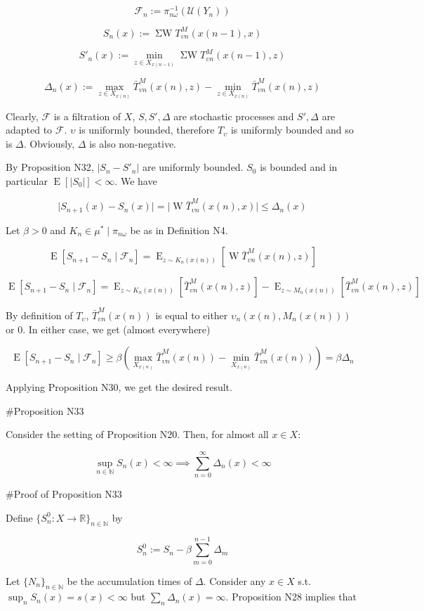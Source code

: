 \documentclass[a4paper]{article}
\DeclareMathOperator{\E}{E}
\newcommand{\Nats}{\mathbb{N}}
\newcommand{\Reals}{\mathbb{R}}
\newcommand{\Sq}[2]{\{#1\}_{#2 \in \Nats}}
\newcommand{\Sqn}[1]{\Sq{#1}{n}}
\newcommand{\Abs}[1]{\lvert #1 \rvert}
\newcommand{\UM}{\mathcal{U}}
\newcommand{\W}{\operatorname{W}}
\newcommand{\SW}{\operatorname{\Sigma W}}
\newcommand{\F}{\mathcal{F}}
\begin{document}
$${\F_n := \pi_{n\omega}^{-1}(\UM(Y_n))}$$

$$S_n(x):= \SW T^M_{\upsilon n}(x(n-1),x)$$

$$S'_n(x):= \min_{z \in X_{x(n-1)}} \SW T^M_{\upsilon n}(x(n-1),z)$$

$$\Delta_n(x):=\max_{z \in X_{x(n)}} \bar{T}^M_{\upsilon n}(x(n),z) - \min_{z \in X_{x(n)}} \bar{T}^M_{\upsilon n}(x(n),z)$$

Clearly, ${\F}$ is a filtration of ${X}$, ${S,S',\Delta}$ are stochastic processes and ${S',\Delta}$ are adapted to ${\F}$. ${\upsilon}$ is uniformly bounded, therefore ${T_\upsilon}$  is uniformly bounded and so is ${\Delta}$. Obviously, ${\Delta}$ is also non-negative.

By Proposition N32, ${\Abs{S_n-S'_n}}$ are uniformly bounded. ${S_0}$ is bounded and in particular ${\E[\Abs{S_0}] < \infty}$. We have

$$\Abs{S_{n+1}(x)-S_n(x)} = \Abs{\W \bar{T}_{\upsilon n}^M(x(n),x)} \leq \Delta_n(x)$$

Let $\beta > 0$ and $K_n \in \mu^* \mid \pi_{n\omega}$ be as in Definition N4. 

$$\E[S_{n+1} - S_n \mid \F_n] = \E_{z \sim K_n(x(n))}[\W \bar{T}_{\upsilon n}^M(x(n),z)]$$

$$\E[S_{n+1} - S_n \mid \F_n] = \E_{z \sim K_n(x(n))}[\bar{T}_{\upsilon n}^M(x(n),z)] - \E_{z \sim M_n(x(n))}[\bar{T}_{\upsilon n}^M(x(n),z)]$$

By definition of $T_\upsilon$, $\bar{T}_{\upsilon n}^M(x(n))$ is equal to either $\upsilon_n(x(n),M_n(x(n)))$ or 0. In either case, we get (almost everywhere)

$$\E[S_{n+1} - S_n \mid \F_n] \geq \beta (\max_{X_{x(n)}} \bar{T}_{\upsilon n}^M(x(n)) - \min_{X_{x(n)}} \bar{T}_{\upsilon n}^M(x(n))) = \beta \Delta_n$$

Applying Proposition N30, we get the desired result.

\#Proposition N33

Consider the setting of Proposition N20. Then, for almost all $x \in X$:

$$\sup_{n \in \Nats} S_n(x) < \infty \implies \sum_{n = 0}^\infty \Delta_n(x) < \infty$$

\#Proof of Proposition N33

Define $\Sqn{S^0_n: X \rightarrow \Reals}$ by

$$S^0_n := S_n - \beta \sum_{m=0}^{n-1} \Delta_m$$

Let $\Sqn{N_n}$ be the accumulation times of $\Delta$. Consider any $x \in X$ s.t. $\sup_n S_n(x) = s(x) < \infty$ but $\sum_n \Delta_n(x) = \infty$. Proposition N28 implies that
\end{document}
